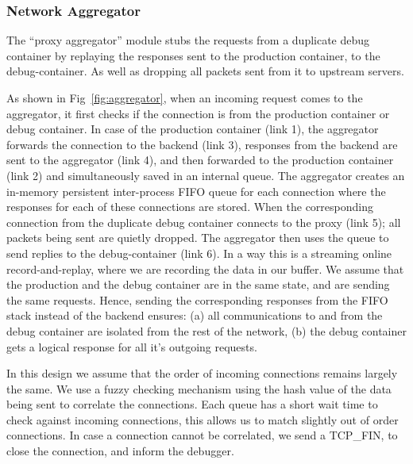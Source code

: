 \noindent \subsubsection{Network Aggregator} 
The ``proxy aggregator'' module stubs the requests from a duplicate debug container by replaying the responses sent to the production container, to the debug-container.
As well as dropping all packets sent from it to upstream servers.

As shown in  Fig~\ref{fig:aggregator}, when an incoming request comes to the aggregator, it first checks if the connection is from the production container or debug container. 
In case of the production container (link 1), the aggregator forwards the connection to the backend (link 3), responses from the backend are sent to the aggregator (link 4), and then forwarded to the production container (link 2) and simultaneously saved in an internal queue.
The aggregator creates an in-memory persistent inter-process FIFO queue for each connection where the responses for each of these connections are stored.
When the corresponding connection from the duplicate debug container connects to the proxy (link 5); all packets being sent are quietly dropped. 
The aggregator then uses the queue to send replies to the debug-container (link 6).
In a way this is a streaming online record-and-replay, where we are recording the data in our buffer.
We assume that the production and the debug container are in the same state, and are sending the same requests. 
Hence, sending the corresponding responses from the FIFO stack instead of the backend ensures: (a) all communications to and from the debug container are isolated from the rest of the network, (b) the debug container gets a logical response for all it's outgoing requests.

In this design we assume that the order of incoming connections remains largely the same.
We use a fuzzy checking mechanism using the hash value of the data being sent to correlate the connections. 
Each queue has a short wait time to check against incoming connections, this allows us to match slightly out of order connections.
In case a connection cannot be correlated, we send a TCP\_FIN, to close the connection, and inform the debugger.

